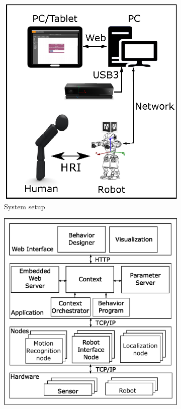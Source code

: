 \begin{figure}
\centering
\begin{subfigure}[t]{0.48\textwidth}
\includegraphics[width=\textwidth]{../thesis/assets/system_setup.eps}
\caption[System setup]{System setup}
\label{fig:system_setup}
\end{subfigure}
\begin{subfigure}[t]{0.48\textwidth}
\includegraphics[width=\textwidth]{../thesis/assets/architecture.eps}

\end{subfigure}
\end{figure}
